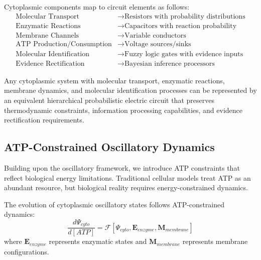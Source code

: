 ﻿\documentclass[11pt,a4paper]{article}
\begin{document}
\begin{definition}
Cytoplasmic components map to circuit elements as follows:
\begin{align}
\text{Molecular Transport} &\rightarrow \text{Resistors with probability distributions} \\
\text{Enzymatic Reactions} &\rightarrow \text{Capacitors with reaction probability} \\
\text{Membrane Channels} &\rightarrow \text{Variable conductors} \\
\text{ATP Production/Consumption} &\rightarrow \text{Voltage sources/sinks} \\
\text{Molecular Identification} &\rightarrow \text{Fuzzy logic gates with evidence inputs} \\
\text{Evidence Rectification} &\rightarrow \text{Bayesian inference processors}
\end{align}
\end{definition}

\begin{theorem}
Any cytoplasmic system with molecular transport, enzymatic reactions, membrane dynamics, and molecular identification processes can be represented by an equivalent hierarchical probabilistic electric circuit that preserves thermodynamic constraints, information processing capabilities, and evidence rectification requirements.
\end{theorem}

\subsection{ATP-Constrained Oscillatory Dynamics}

Building upon the oscillatory framework, we introduce ATP constraints that reflect biological energy limitations. Traditional cellular models treat ATP as an abundant resource, but biological reality requires energy-constrained dynamics.

\begin{definition}
The evolution of cytoplasmic oscillatory states follows ATP-constrained dynamics:
\begin{equation}
\frac{d\Psi_{cyto}}{d[ATP]} = \mathcal{F}[\Psi_{cyto}, \mathbf{E}_{enzyme}, \mathbf{M}_{membrane}]
\end{equation}
where $\mathbf{E}_{enzyme}$ represents enzymatic states and $\mathbf{M}_{membrane}$ represents membrane configurations.
\end{definition}
\end{document}
